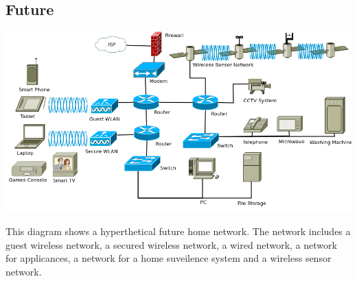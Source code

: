 \documentclass[12pt]{report}
\begin{document}
\begin{landscape}
\section{Future}
\begin{center}
\includegraphics[width=0.9\linewidth]{../Diagrams/Network/FutureHomenet.png}
\end{center}
This diagram shows a hyperthetical future home network. The network includes a
guest wireless network, a secured wireless network, a wired network, a network
for applicances, a network for a home suveilence system and a wireless sensor
network. 


\end{landscape}
\end{document}
